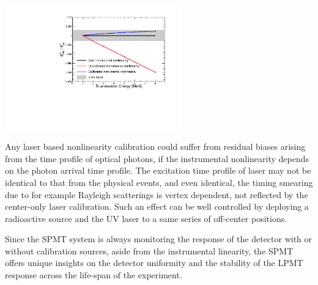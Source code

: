 \documentclass[a4paper,10pt,twoside]{cpc-hepnp}
\begin{document}
\begin{CJK*}{GB}{gbsn}
\begin{multicols}{2}
\begin{center}
  \centering
  \includegraphics[width=3in]{Plot_instrumental_nonlinearity_calibration.pdf}
  \label{fig:inst_nonlinearity}
\end{center}


	Any laser based nonlinearity calibration could suffer
  from residual biases arising from the time profile of optical
  photons, if the instrumental nonlinearity depends on the photon
  arrival time profile. The excitation time profile of laser may not
  be identical to that from the physical events, and even identical,
  the timing smearing due to for example Rayleigh scatterings is
  vertex dependent, not reflected by the center-only laser
  calibration.  Such an effect can be well controlled by deploying a
  radioactive source and the UV laser to a same series of off-center
  positions.

Since the SPMT system is always monitoring the response of the
detector with or without calibration sources, aside from the
instrumental linearity, the SPMT offers unique insights on the
detector uniformity and the stability of the LPMT response across the
life-span of the experiment.


\end{multicols}
\end{CJK*}
\end{document}

